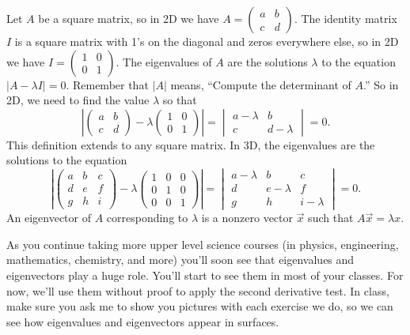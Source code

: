 \begin{definition}
 Let $A$ be a square matrix, so in 2D we have $A=\begin{pmatrix} a&b\\c&d \end{pmatrix}$. The identity matrix $I$ is a square matrix with 1's on the diagonal and zeros everywhere else, so in 2D we have $I = \begin{pmatrix} 1&0\\0&1 \end{pmatrix}$. The eigenvalues of $A$ are the solutions $\lambda$ to the equation $|A-\lambda I|=0$. Remember that $|A|$ means, ``Compute the determinant of $A$.'' So in 2D, we need to find the value $\lambda$ so that 
 $$\left|\begin{pmatrix} a&b\\c&d\end{pmatrix}-\lambda  \begin{pmatrix} 1&0\\0&1 \end{pmatrix} \right|=\begin{vmatrix} a-\lambda &b\\c&d-\lambda \end{vmatrix}=0.$$
 This definition extends to any square matrix.  In 3D, the eigenvalues are the solutions to the equation
 $$\left|\begin{pmatrix} a&b&c\\d&e&f\\g&h&i\end{pmatrix}-\lambda 
\begin{pmatrix} 1&0&0\\0&1&0\\0&0&1\end{pmatrix} \right| = 
           \begin{vmatrix} a-\lambda&b&c\\d&e-\lambda&f\\g&h&i-\lambda\end{vmatrix}=0.$$
 An eigenvector of $A$ corresponding to $\lambda$ is a nonzero vector $\vec x$ such that $A\vec x=\lambda x$. 
\end{definition}

As you continue taking more upper level science courses (in physics, engineering, mathematics, chemistry, and more) you'll soon see that eigenvalues and eigenvectors play a huge role.  You'll start to see them in most of your classes. For now, we'll use them without proof to apply the second derivative test. In class, make sure you ask me to show you pictures with each exercise we do, so we can see how eigenvalues and eigenvectors appear in surfaces.


